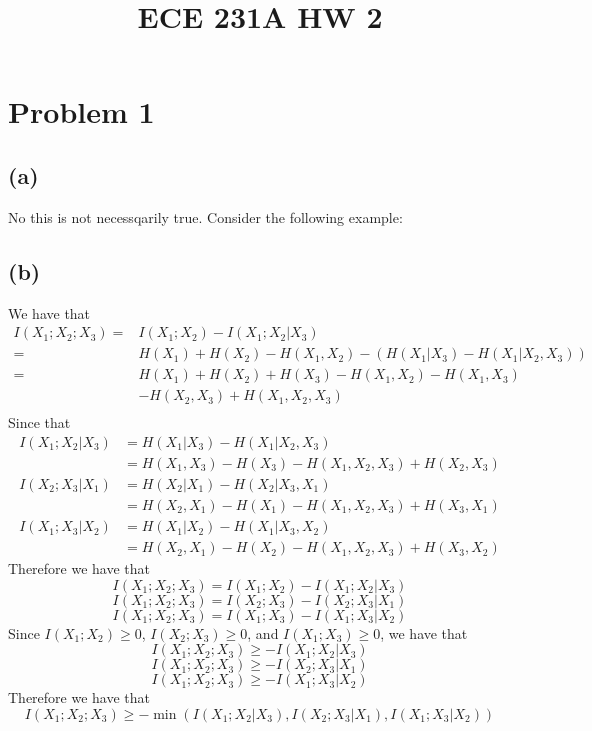 
\title{ECE 231A HW 2}

\maketitle
\section*{Problem 1}
\subsection*{(a)}
No this is not necessqarily true.  Consider the following example:

\subsection*{(b)}
We have that
\begin{align*}
    I(X_1;X_2;X_3)=&I(X_1;X_2)-I(X_1;X_2|X_3)\\
    =&H(X_1)+H(X_2)-H(X_1,X_2)-\left(
        H(X_1|X_3)-H(X_1|X_2,X_3)
    \right)\\
    =&H(X_1)+H(X_2)+H(X_3)-H(X_1,X_2)-H(X_1,X_3)\\&-H(X_2,X_3)+H(X_1,X_2,X_3)\\
\end{align*}
Since that
\begin{align*}
    I(X_1;X_2|X_3)&=H(X_1|X_3)-H(X_1|X_2,X_3)\\
    &=H(X_1,X_3)-H(X_3)-H(X_1,X_2,X_3)+H(X_2,X_3)
\end{align*}
\begin{align*}
    I(X_2;X_3|X_1)&=H(X_2|X_1)-H(X_2|X_3,X_1)\\
    &=H(X_2,X_1)-H(X_1)-H(X_1,X_2,X_3)+H(X_3,X_1)
\end{align*}
\begin{align*}
    I(X_1;X_3|X_2)&=H(X_1|X_2)-H(X_1|X_3,X_2)\\
    &=H(X_2,X_1)-H(X_2)-H(X_1,X_2,X_3)+H(X_3,X_2)
\end{align*}
Therefore we have that
$$I(X_1;X_2;X_3)=I(X_1;X_2)-I(X_1;X_2|X_3)$$
$$I(X_1;X_2;X_3)=I(X_2;X_3)-I(X_2;X_3|X_1)$$
$$I(X_1;X_2;X_3)=I(X_1;X_3)-I(X_1;X_3|X_2)$$
Since $I(X_1;X_2)\geq0$, $I(X_2;X_3)\geq0$, and $I(X_1;X_3)\geq0$, we have that
$$I(X_1;X_2;X_3)\geq-I(X_1;X_2|X_3)$$
$$I(X_1;X_2;X_3)\geq-I(X_2;X_3|X_1)$$
$$I(X_1;X_2;X_3)\geq-I(X_1;X_3|X_2)$$
Therefore we have that
$$I(X_1;X_2;X_3)\geq-\min(I(X_1;X_2|X_3),I(X_2;X_3|X_1),I(X_1;X_3|X_2))$$
